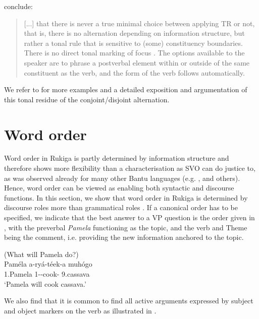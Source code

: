 \documentclass[output=paper]{langscibook}
\begin{document}
\z


 conclude: 
\begin{quote}
    [...] that there is never a true minimal choice between applying TR or not, that is, there is no alternation depending on information structure, but rather a tonal rule that is sensitive to (some) constituency boundaries. There is no direct tonal marking of focus \citep[see][]{Hyman1999}. The options available to the speaker are to phrase a postverbal element within or outside of the same constituent as the verb, and the form of the verb follows automatically. \citep[56]{vanderWalAsiimwe2020}
\end{quote}

We refer to \citet{vanderWalAsiimwe2020} for more examples and a detailed exposition and argumentation of this tonal residue of the conjoint/disjoint alternation. 

\section{Word order}\label{sec:wordorder}

Word order in Rukiga is partly determined by information structure and therefore shows more flexibility than a characterisation as SVO can do justice to, as was observed already for many other Bantu languages (e.g. \citealt{Morimoto2000,Zerbian2006,vanderWal2009a,Yoneda2011,BostoenMundeke2012,KerrEtAl2023}, and others). Hence, word order can be viewed as enabling both syntactic and discourse functions. In this section, we show that word order in Rukiga is determined by discourse roles more than grammatical roles \citep{KerrEtAl2023}. If a canonical order has to be specified, we indicate that the best answer to a VP question is the order given in , with the preverbal \textit{Pamela} functioning as the topic, and the verb and Theme being the comment, i.e. providing the new information anchored to the topic.

\ea
\label{bkm:Ref53392113}
(What will Pamela do?)\\
\gll
Paméla  a-ryá-téek-a  muhógo\\
1.Pamela  1\SM{}-\FUT{}-cook-\FV{}  9.cassava\\
\glt
‘Pamela will cook cassava.’\\

\z

We also find that it is common to find all active arguments expressed by subject and object markers on the verb as illustrated in .
\end{document}
